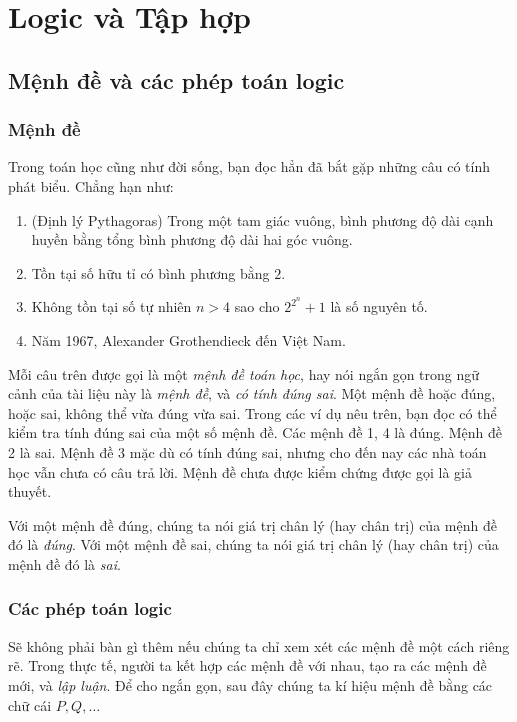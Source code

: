 \chapter{Logic và Tập hợp}\label{chapter:logic-and-set-theory}

\section{Mệnh đề và các phép toán logic}

\subsection{Mệnh đề}

Trong toán học cũng như đời sống, bạn đọc hẳn đã bắt gặp những câu có tính phát biểu. Chẳng hạn như:

\begin{enumerate}[label={(\arabic*)}]
    \item (Định lý Pythagoras) Trong một tam giác vuông, bình phương độ dài cạnh huyền bằng tổng bình phương độ dài hai góc vuông.
    \item Tồn tại số hữu tỉ có bình phương bằng $2$.
    \item Không tồn tại số tự nhiên $n > 4$ sao cho $2^{2^{n}} + 1$ là số nguyên tố.
    \item Năm 1967, Alexander Grothendieck đến Việt Nam.
\end{enumerate}

Mỗi câu trên được gọi là một \textit{mệnh đề toán học}, hay nói ngắn gọn trong ngữ cảnh của tài liệu này là \textit{mệnh đề}, và \textit{có tính đúng sai}. Một mệnh đề hoặc đúng, hoặc sai, không thể vừa đúng vừa sai. Trong các ví dụ nêu trên, bạn đọc có thể kiểm tra tính đúng sai của một số mệnh đề. Các mệnh đề 1, 4 là đúng. Mệnh đề 2 là sai. Mệnh đề 3 mặc dù có tính đúng sai, nhưng cho đến nay các nhà toán học vẫn chưa có câu trả lời. Mệnh đề chưa được kiểm chứng được gọi là giả thuyết.

Với một mệnh đề đúng, chúng ta nói giá trị chân lý (hay chân trị) của mệnh đề đó là \textit{đúng}. Với một mệnh đề sai, chúng ta nói giá trị chân lý (hay chân trị) của mệnh đề đó là \textit{sai}.

\subsection{Các phép toán logic}

Sẽ không phải bàn gì thêm nếu chúng ta chỉ xem xét các mệnh đề một cách riêng rẽ. Trong thực tế, người ta kết hợp các mệnh đề với nhau, tạo ra các mệnh đề mới, và \textit{lập luận}. Để cho ngắn gọn, sau đây chúng ta kí hiệu mệnh đề bằng các chữ cái $P, Q,\ldots$

